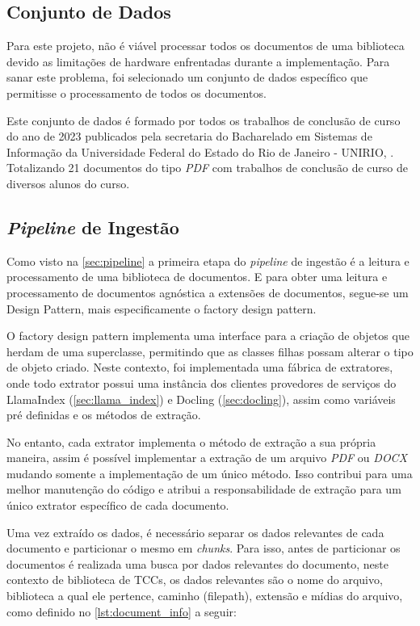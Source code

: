 \documentclass[a4paper, 12pt]{article}
\newcommand{\citeb}[1]{\bibleftbracket\cite{#1}\bibrightbracket}
\begin{document}
    \subsection{Conjunto de Dados}

    Para este projeto, não é viável processar todos os documentos de uma biblioteca devido as limitações de hardware enfrentadas durante a implementação. Para sanar este problema, foi selecionado um conjunto de dados específico que permitisse o processamento de todos os documentos.

    Este conjunto de dados é formado por todos os trabalhos de conclusão de curso do ano de 2023 publicados pela secretaria do Bacharelado em Sistemas de Informação da Universidade Federal do Estado do Rio de Janeiro - UNIRIO, \citeb{tccs_unirio}. Totalizando 21 documentos do tipo \textit{PDF} com trabalhos de conclusão de curso de diversos alunos do curso.

    \subsection{\textit{Pipeline} de Ingestão}
    
    Como visto na \autoref{sec:pipeline} a primeira etapa do \textit{pipeline} de ingestão é a leitura e processamento de uma biblioteca de documentos. E para obter uma leitura e processamento de documentos agnóstica a extensões de documentos, segue-se  um Design Pattern, mais especificamente o factory design pattern. 
    
    O factory design pattern implementa uma interface para a criação de objetos que herdam de uma superclasse, permitindo que as classes filhas possam alterar o tipo de objeto criado. Neste contexto, foi implementada uma fábrica de extratores, onde todo extrator possui uma instância dos clientes provedores de serviços do LlamaIndex (\autoref{sec:llama_index}) e Docling (\autoref{sec:docling}), assim como variáveis pré definidas e os métodos de extração.
    
    No entanto, cada extrator implementa o método de extração a sua própria maneira, assim é possível implementar a extração de um arquivo \textit{PDF} ou \textit{DOCX} mudando somente a implementação de um único método. Isso contribui para uma melhor manutenção do código e atribui a responsabilidade de extração para um único extrator específico de cada documento.

    Uma vez extraído os dados, é necessário separar os dados relevantes de cada documento e particionar o mesmo em \textit{chunks}. Para isso, antes de particionar os documentos é realizada uma busca por dados relevantes do documento, neste contexto de biblioteca de TCCs, os dados relevantes são o nome do arquivo, biblioteca a qual ele pertence, caminho (filepath), extensão e mídias do arquivo, como definido no \autoref{lst:document_info} a seguir:
    
\end{document}
